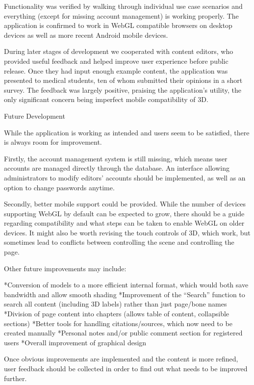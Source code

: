 Functionality was verified by walking through individual use case scenarios and everything (except for missing account management) is working properly. The application is confirmed to work in WebGL compatible browsers on desktop devices as well as more recent Android mobile devices.

During later stages of development we cooperated with content editors, who provided useful feedback and helped improve user experience before public release. Once they had input enough example content, the application was presented to medical students, ten of whom submitted their opinions in a short survey. The feedback was largely positive, praising the application’s utility, the only significant concern being imperfect mobile compatibility of 3D.

\sec Future Development

While the application is working as intended and users seem to be satisfied, there is always room for improvement.

Firstly, the account management system is still missing, which means user accounts are managed directly through the database. An interface allowing administrators to modify editors’ accounts should be implemented, as well as an option to change passwords anytime.

Secondly, better mobile support could be provided. While the number of devices supporting WebGL by default can be expected to grow, there should be a guide regarding compatibility and what steps can be taken to enable WebGL on older devices. It might also be worth revising the touch controls of 3D, which work, but sometimes lead to conflicts between controlling the scene and controlling the page.

Other future improvements may include:

\begitems
*Conversion of models to a more efficient internal format, which would both save bandwidth and allow smooth shading
*Improvement of the “Search” function to search all content (including 3D labels) rather than just page/bone names
*Division of page content into chapters (allows table of content, collapsible sections)
*Better tools for handling citations/sources, which now need to be created manually
*Personal notes and/or public comment section for registered users
*Overall improvement of graphical design
\enditems

Once obvious improvements are implemented and the content is more refined, user feedback should be collected in order to find out what needs to be improved further.
